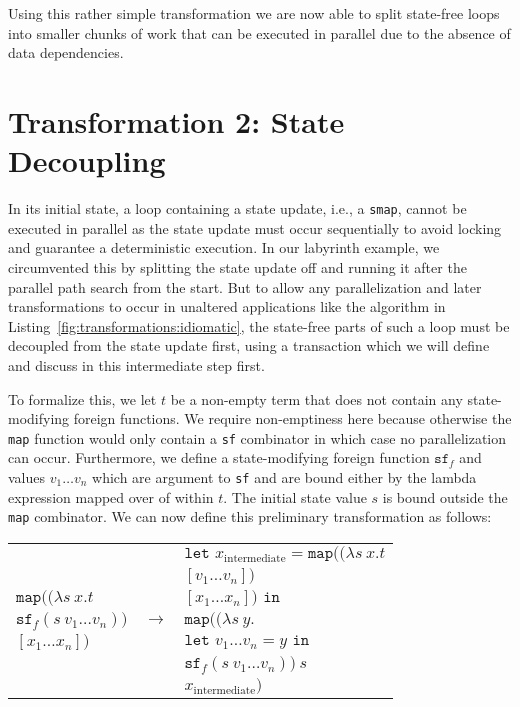 Using this rather simple transformation we are now able to split state-free loops into smaller chunks of work that can be executed in parallel due to the absence of data dependencies.

\section{Transformation 2: State Decoupling}%
\label{sec:transformations:tf15}

In its initial state, a loop containing a state update, i.e., a \texttt{smap}, cannot be executed in parallel as the state update must occur sequentially to avoid locking and guarantee a deterministic execution.
In our labyrinth example, we circumvented this by splitting the state update off and running it after the parallel path search from the start.
But to allow any parallelization and later transformations to occur in unaltered applications like the algorithm in Listing~\ref{fig:transformations:idiomatic}, the state-free parts of such a loop must be decoupled from the state update first, using a transaction which we will define and discuss in this intermediate step first.

To formalize this, we let $t$ be a non-empty term that does not contain any state-modifying foreign functions.
We require non-emptiness here because otherwise the \texttt{map} function would only contain a \texttt{sf} combinator in which case no parallelization can occur.
Furthermore, we define a state-modifying foreign function $\texttt{sf}_f$ and values $v_1 \dots v_n$ which are argument to \texttt{sf} and are bound either by the lambda expression mapped over of within $t$.
The initial state value $s$ is bound outside the \texttt{map} combinator.
We can now define this preliminary transformation as follows:
\begin{center}
    \begin{tabular}{l c l}
        & \multirow{7}{*}{$\longrightarrow$} & $\texttt{let } x_\text{intermediate} = \texttt{map} ((\lambda s\ x.t$\\
        && \hspace*{4.9cm}$[v_1 \dots v_n])$\\
        $\texttt{map} ((\lambda s\ x.t$ && \hspace*{4cm}$[x_1 \dots x_n]) \texttt{ in}$\\
        \hspace*{1.65cm}$\texttt{sf}_f (s\ v_1 \dots v_n))$ && \hspace*{.3cm}$\texttt{map}(( \lambda s\ y.$\\
        \hspace*{.9cm}$[x_1 \dots x_n])$ && \hspace*{1.95cm}$\texttt{let } v_1 \dots v_n = y \texttt{ in}$\\
                                          && \hspace*{2.25cm}$\texttt{sf}_f (s\ v_1 \dots v_n))\ s$\\
                                          && \hspace*{1.1cm}$x_\text{intermediate})$
    \end{tabular}
\end{center}

